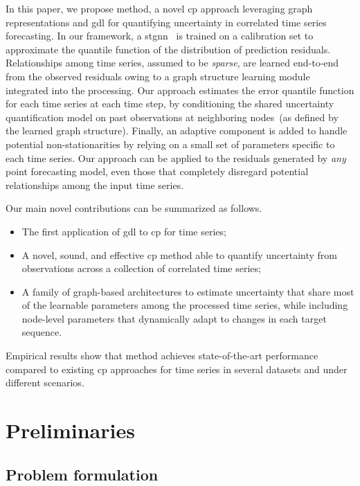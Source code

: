 In this paper, we propose \gls{method}, a novel \gls{cp} approach leveraging graph representations and \gls{gdl} for quantifying uncertainty in correlated time series forecasting. In our framework, a \gls{stgnn}~\citep{jin2023survey, cini2023graphdeep} is trained on a calibration set to approximate the quantile function of the distribution of prediction residuals. Relationships among time series, assumed to be \textit{sparse}, are learned end-to-end from the observed residuals owing to a graph structure learning module integrated into the processing. Our approach estimates the error quantile function for each time series at each time step, by conditioning the shared uncertainty quantification model on past observations at neighboring nodes~(as defined by the learned graph structure). {Finally, an adaptive component is added to handle potential non-stationarities by relying on a small set of parameters specific to each time series.} Our approach can be applied to the residuals generated by \textit{any} point forecasting model, even those that completely disregard potential relationships among the input time series.

Our main novel contributions can be summarized as follows.
\begin{itemize}
    \item The first application of \gls{gdl} to \gls{cp} for time series;
    \item A novel, sound, and effective \gls{cp} method able to quantify uncertainty from observations across a collection of correlated time series;
    \item A family of graph-based architectures to estimate uncertainty that share most of the learnable parameters among the processed time series, {while including node-level parameters that dynamically adapt to changes in each target sequence}.
\end{itemize}
Empirical results show that \gls{method} achieves state-of-the-art performance compared to existing \gls{cp} approaches for time series in several datasets and under different scenarios.

\section{Preliminaries}\label{sec:preliminaries}

\subsection{Problem formulation}\label{sec:forecasting} 

